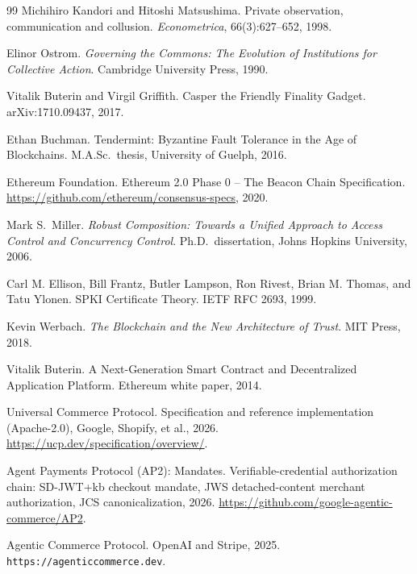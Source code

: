 \documentclass[11pt,a4paper]{article}
\theoremstyle{definition}
\theoremstyle{remark}
\begin{document}
\begin{thebibliography}{99}
Michihiro Kandori and Hitoshi Matsushima.
\newblock Private observation, communication and collusion.
\newblock \textit{Econometrica}, 66(3):627--652, 1998.

Elinor Ostrom.
\newblock \textit{Governing the Commons: The Evolution of Institutions for Collective Action}.
\newblock Cambridge University Press, 1990.

Vitalik Buterin and Virgil Griffith.
\newblock Casper the Friendly Finality Gadget.
\newblock arXiv:1710.09437, 2017.

Ethan Buchman.
\newblock Tendermint: Byzantine Fault Tolerance in the Age of Blockchains.
\newblock M.A.Sc.\ thesis, University of Guelph, 2016.

Ethereum Foundation.
\newblock Ethereum 2.0 Phase 0 -- The Beacon Chain Specification.
\newblock \url{https://github.com/ethereum/consensus-specs}, 2020.

Mark S.\ Miller.
\newblock \textit{Robust Composition: Towards a Unified Approach to Access Control and Concurrency Control}.
\newblock Ph.D.\ dissertation, Johns Hopkins University, 2006.

Carl M. Ellison, Bill Frantz, Butler Lampson, Ron Rivest, Brian M. Thomas, and Tatu Ylonen.
\newblock SPKI Certificate Theory.
\newblock IETF RFC 2693, 1999.

Kevin Werbach.
\newblock \textit{The Blockchain and the New Architecture of Trust}.
\newblock MIT Press, 2018.

Vitalik Buterin.
\newblock A Next-Generation Smart Contract and Decentralized Application Platform.
\newblock Ethereum white paper, 2014.

Universal Commerce Protocol.
\newblock Specification and reference implementation (Apache-2.0), Google, Shopify, et al., 2026.
\newblock \url{https://ucp.dev/specification/overview/}.

Agent Payments Protocol (AP2): Mandates.
\newblock Verifiable-credential authorization chain: SD-JWT+kb checkout mandate, JWS detached-content merchant authorization, JCS canonicalization, 2026.
\newblock \url{https://github.com/google-agentic-commerce/AP2}.

Agentic Commerce Protocol.
\newblock OpenAI and Stripe, 2025.
\newblock \texttt{https://agenticcommerce.dev}.


\end{thebibliography}
\end{document}
